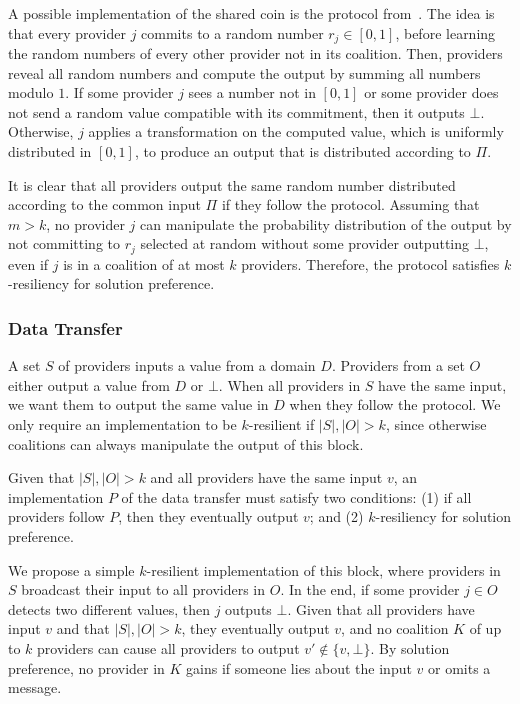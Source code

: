 A possible implementation of the shared coin is the protocol from~\cite{Abraham2013}.
The idea is that every provider $j$ commits to a random number $r_j \in [0,1]$,
before learning the random numbers of every other provider not in its coalition.
Then, providers reveal all random numbers and compute the output by summing all numbers modulo $1$.
If some provider $j$ sees a number not in $[0,1]$ or some provider does not send
a random value compatible with its commitment, then it outputs $\bot$.
Otherwise, $j$ applies a transformation on the computed value, which is uniformly distributed in $[0,1]$,
to produce an output that is distributed according to $\Pi$.

It is clear that all providers output the same random number distributed according to the common input $\Pi$
if they follow the protocol. Assuming that $m > k$, no provider $j$ can manipulate
the probability distribution of the output by not committing to $r_j$ selected at random
without some provider outputting $\bot$, even if $j$ is in a coalition of at most $k$ providers.
Therefore, the protocol satisfies $k$-resiliency for solution preference.

\subsubsection{Data Transfer}
A set $S$ of providers inputs a value from a domain $D$.
Providers from a set $O$ either output a value from $D$ or $\bot$.
When all providers in $S$ have the same input,
we want them to output the same value in $D$ when they follow the protocol.
We only require an implementation to be $k$-resilient if $|S|,|O| > k$,
since otherwise coalitions can always manipulate the output of this block.

\begin{property}
\label{prop:data-transfer}
Given that $|S|,|O| > k$ and all providers have the same input $v$,
an implementation $P$ of the data transfer must satisfy two conditions: 
(1) if all providers follow $P$, then they eventually output $v$;
and (2) $k$-resiliency for solution preference.
\end{property}

We propose a simple $k$-resilient implementation of this block,
where providers in $S$ broadcast their input to all providers in $O$.
In the end, if some provider $j \in O$ detects two different values,
then $j$ outputs $\bot$. Given that all providers
have input $v$ and that $|S|,|O| > k$,
they eventually output $v$, and
no coalition $K$ of up to $k$ providers
can cause all providers to output $v' \notin \{v,\bot\}$.
By solution preference, no provider in $K$ gains if someone lies
about the input $v$ or omits a message.

